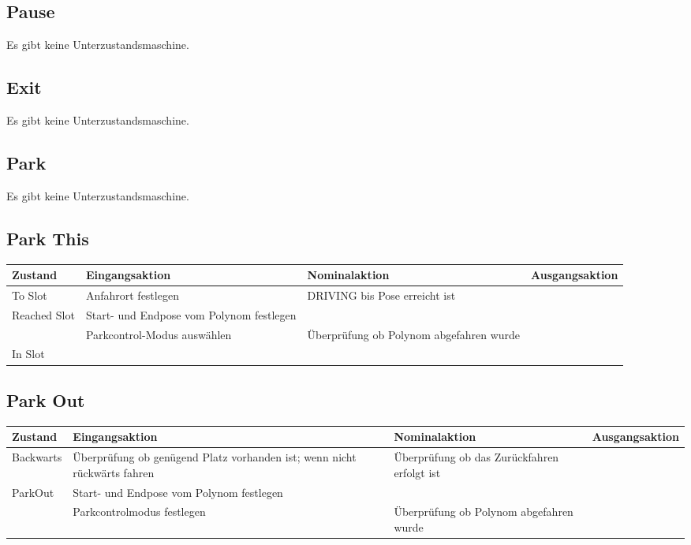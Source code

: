 \subsection{Pause}

Es gibt keine Unterzustandsmaschine.

\subsection{Exit}

Es gibt keine Unterzustandsmaschine.

\subsection{Park}

Es gibt keine Unterzustandsmaschine.

\subsection{Park This}

\begin{tabular}{|p{1.5cm}|p{4cm}|p{4cm}|p{3cm}|}
	\hline 
	Zustand & Eingangsaktion & Nominalaktion & Ausgangsaktion \\ 
	\hline 
	To Slot & Anfahrort festlegen & DRIVING bis Pose erreicht ist &  \\ 
	\hline 
	Reached Slot & Start- und Endpose vom Polynom festlegen &  &  \\ 
	\hline 
	 & Parkcontrol-Modus auswählen & Überprüfung ob Polynom abgefahren wurde &  \\ 
	\hline
	In Slot &  &  &  \\ 
	\hline 
	
\end{tabular} 

\subsection{Park Out}

\begin{tabular}{|p{1.7cm}|p{4cm}|p{4cm}|p{3cm}|}
	\hline 
	Zustand & Eingangsaktion & Nominalaktion & Ausgangsaktion \\ 
	\hline 
	Backwarts & Überprüfung ob genügend Platz vorhanden ist; wenn nicht rückwärts fahren & Überprüfung ob das Zurückfahren erfolgt ist &  \\ 
	\hline 
	ParkOut & Start- und Endpose vom Polynom festlegen  &  &  \\ 
	\hline  
	& Parkcontrolmodus festlegen & Überprüfung ob Polynom abgefahren wurde &  \\ 
	\hline
 
\end{tabular} 